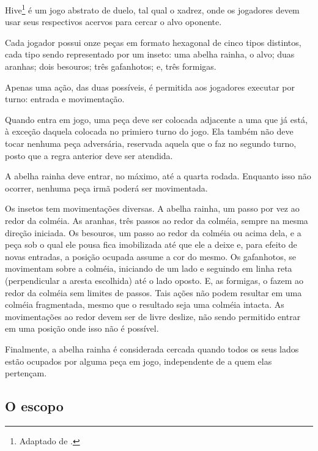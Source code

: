       Hive\footnote{Adaptado de \cite{UltraBoardGames2020}.} é um jogo
      abstrato de duelo, tal qual o xadrez, onde os jogadores devem usar seus
      respectivos acervos para cercar o alvo oponente.

      Cada jogador possui onze peças em formato hexagonal de cinco tipos
      distintos, cada tipo sendo representado por um inseto: uma abelha rainha, o
      alvo; duas aranhas; dois besouros; três gafanhotos; e, três formigas.

      Apenas uma ação, das duas possíveis, é permitida aos jogadores executar por
      turno: entrada e movimentação.

      Quando entra em jogo, uma peça deve ser colocada adjacente a uma que já
      está, à exceção daquela colocada no primiero turno do jogo. Ela também não
      deve tocar nenhuma peça adversária, reservada aquela que o faz no segundo
      turno, posto que a regra anterior deve ser atendida.

      A abelha rainha deve entrar, no máximo, até a quarta rodada. Enquanto isso
      não ocorrer, nenhuma peça irmã poderá ser movimentada.

      Os insetos tem movimentações diversas. A abelha rainha, um passo por vez ao
      redor da colméia. As aranhas, três passos ao redor da colméia, sempre na
      mesma direção iniciada. Os besouros, um passo ao redor da colméia ou acima
      dela, e a peça sob o qual ele pousa fica imobilizada até que ele a deixe e,
      para efeito de novas entradas, a posição ocupada assume a cor do mesmo. Os
      gafanhotos, se movimentam sobre a colméia, iniciando de um lado e seguindo
      em linha reta (perpendicular a aresta escolhida) até o lado oposto.
      E,  as formigas, o fazem ao redor da colméia sem limites de passos. Tais
      ações não podem resultar em uma colméia fragmentada, mesmo que o resultado
      seja uma colméia intacta. As movimentações ao redor devem ser de livre
      deslize, não sendo permitido entrar em uma posição onde isso não é possível.

      Finalmente, a abelha rainha é considerada cercada quando todos os seus lados
      estão ocupados por alguma peça em jogo, independente de a quem elas
      pertençam.


    \subsection{O escopo}

